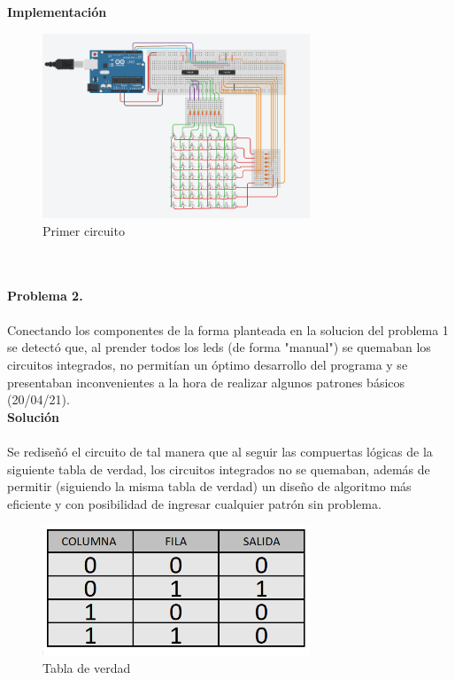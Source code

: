 \documentclass{article}
\begin{document}
\textbf{\large Implementación}\\
\begin{figure}[h]
    \includegraphics[width=8cm]{Imagen1.png}
    \centering
    \caption{Primer circuito}
    \label{fig:Imagen1}
\end{figure}\\\\

\textbf{\large Problema 2.}\\\\
Conectando los componentes de la forma planteada en la solucion del problema 1 se detectó que, al prender todos los leds (de forma "manual") se quemaban los circuitos integrados, no permitían un óptimo desarrollo del programa y se presentaban inconvenientes a la hora de realizar algunos patrones básicos (20/04/21).\\


\textbf{\large Solución}\\\\
Se rediseñó el circuito de tal manera que al seguir las compuertas lógicas de la siguiente tabla de verdad, los circuitos integrados no se quemaban, además de permitir (siguiendo la misma tabla de verdad) un diseño de algoritmo más eficiente y con posibilidad de ingresar cualquier patrón sin problema.\\

\begin{figure}[h]
    \includegraphics[width=8cm]{Tabla de verdad.png}
    \centering
    \caption{Tabla de verdad}
    \label{fig:Tabla de verdad}
\end{figure}\\\\
\end{document}

